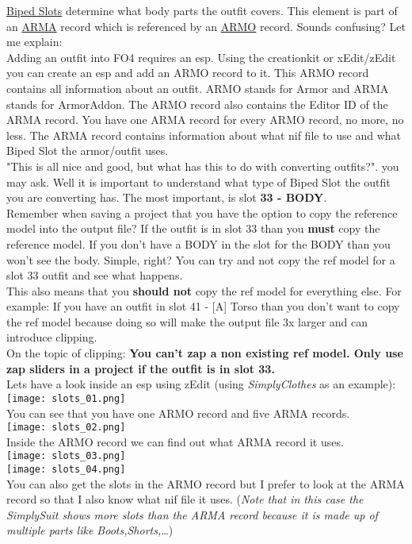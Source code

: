 \href{https://www.creationkit.com/fallout4/index.php?title=Biped_Slots}{Biped Slots} determine what body parts the outfit covers. 
This element is part of an \href{https://www.creationkit.com/fallout4/index.php?title=ArmorAddon}{ARMA} record which is referenced by 
an \href{https://www.creationkit.com/fallout4/index.php?title=Armor}{ARMO} record. Sounds confusing? Let me explain:\\
Adding an outfit into FO4 requires an esp. Using the creationkit or xEdit/zEdit you can create an esp and add an ARMO record to it.
This ARMO record contains all information about an outfit. ARMO stands for Armor and ARMA stands for ArmorAddon. The ARMO record also 
contains the Editor ID of the ARMA record. You have one ARMA record for every ARMO record, no more, no less. The ARMA record contains 
information about what nif file to use and what Biped Slot the armor/outfit uses.\\
"This is all nice and good, but what has this to do with converting outfits?". you may ask. Well it is important to understand 
what type of Biped Slot the outfit you are converting has. The most important, is slot \textbf{33 - BODY}.\\
Remember when saving a project that you have the option to copy the reference model into the output file? If the outfit is in slot 
33 than you \textbf{must} copy the reference model. If you don't have a BODY in the slot for the BODY than you won't see the body.
Simple, right? You can try and not copy the ref model for a slot 33 outfit and see what happens.\\
This also means that you \textbf{should not} copy the ref model for everything else. For example: If you have an outfit in slot 
41 - [A] Torso than you don't want to copy the ref model because doing so will make the output file 3x larger and can introduce
clipping.\\
On the topic of clipping: \textbf{You can't zap a non existing ref model. Only use zap sliders in a project if the outfit is in 
slot 33.}\\
Lets have a look inside an esp using zEdit (using \textit{SimplyClothes} as an example):\\
\texttt{[image: slots\_01.png]}\\
You can see that you have one ARMO record and five ARMA records.\\
\linebreak
\texttt{[image: slots\_02.png]}\\
Inside the ARMO record we can find out what ARMA record it uses.\\
\linebreak
\texttt{[image: slots\_03.png]}\\
\texttt{[image: slots\_04.png]}\\
You can also get the slots in the ARMO record but I prefer to look at the ARMA record so that I also know what nif file it uses.
(\textit{Note that in this case the SimplySuit shows more slots than the ARMA record because it is made up of multiple parts 
like Boots,Shorts,\dots})